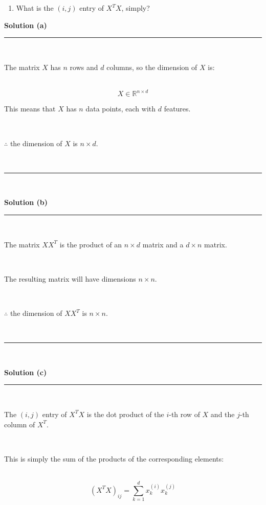 \documentclass{article}
\begin{document}
\begin{enumerate}[label=(c)]
    \item What is the $(i,j)$ entry of  ${X}^TX$, simply?
\end{enumerate}

\parbox{\textwidth}{\textbf{Solution (a)}}

\noindent\rule{\textwidth}{0.4pt}\\

\parbox{\textwidth}{The matrix $X$ has $n$ rows and $d$ columns, so the dimension of $X$ is:}\\

$$X \in \mathbb{R}^{n \times d}$$

\parbox{\textwidth}{This means that $X$ has $n$ data points, each with $d$ features.}\\

\parbox{\textwidth}{$\therefore$ the dimension of $X$ is $n \times d$.}\\

\noindent\rule{\textwidth}{0.4pt}\\

\parbox{\textwidth}{\textbf{Solution (b)}}

\noindent\rule{\textwidth}{0.4pt}\\

\parbox{\textwidth}{The matrix ${XX}^T$ is the product of an $n \times d$ matrix and a $d \times n$ matrix.}\\

\parbox{\textwidth}{The resulting matrix will have dimensions $n \times n$.}\\

\parbox{\textwidth}{$\therefore$ the dimension of ${XX}^T$ is $n \times n$.}\\

\noindent\rule{\textwidth}{0.4pt}\\

\parbox{\textwidth}{\textbf{Solution (c)}}

\noindent\rule{\textwidth}{0.4pt}\\

\parbox{\textwidth}{The $(i,j)$ entry of ${X}^TX$ is the dot product of the $i$-th row of $X$ and the $j$-th column of $X^T$.}\\

\parbox{\textwidth}{This is simply the sum of the products of the corresponding elements:}\\

$$(X^TX)_{ij} = \sum_{k=1}^{d} x^{(i)}_k x^{(j)}_k$$
\end{document}

